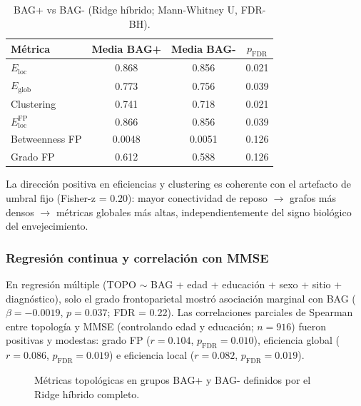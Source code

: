\documentclass[12pt,a4paper]{article}
\begin{document}
\begin{table}[H]
  \centering
  \caption{BAG+ vs BAG- (Ridge híbrido; Mann-Whitney U, FDR-BH).}
  \label{tab:bag_groups}
  \begin{tabular}{lccc}
    \toprule
    Métrica & Media BAG+ & Media BAG- & $p_{\text{FDR}}$ \\
    \midrule
    $E_{\text{loc}}$ & 0.868 & 0.856 & 0.021 \\
    $E_{\text{glob}}$ & 0.773 & 0.756 & 0.039 \\
    Clustering & 0.741 & 0.718 & 0.021 \\
    $E_{\text{loc}}^{\text{FP}}$ & 0.866 & 0.856 & 0.039 \\
    Betweenness FP & 0.0048 & 0.0051 & 0.126 \\
    Grado FP & 0.612 & 0.588 & 0.126 \\
    \bottomrule
  \end{tabular}
\end{table}

La dirección positiva en eficiencias y clustering es coherente con el artefacto de umbral fijo
(Fisher-z = 0.20): mayor conectividad de reposo $\rightarrow$ grafos más densos $\rightarrow$
métricas globales más altas, independientemente del signo biológico del envejecimiento.

\subsubsection{Regresión continua y correlación con MMSE}

En regresión múltiple (TOPO $\sim$ BAG + edad + educación + sexo + sitio + diagnóstico), solo
el grado frontoparietal mostró asociación marginal con BAG ($\beta = -0.0019$, $p = 0.037$;
FDR = 0.22). Las correlaciones parciales de Spearman entre topología y MMSE (controlando edad
y educación; $n = 916$) fueron positivas y modestas: grado FP ($r = 0.104$, $p_{\text{FDR}} = 0.010$),
eficiencia global ($r = 0.086$, $p_{\text{FDR}} = 0.019$) e eficiencia local ($r = 0.082$,
$p_{\text{FDR}} = 0.019$).

\begin{figure}[H]
  \centering
  \caption{Métricas topológicas en grupos BAG+ y BAG- definidos por el Ridge híbrido completo.}
  \label{fig:bag_topo}
\end{figure}
\end{document}

